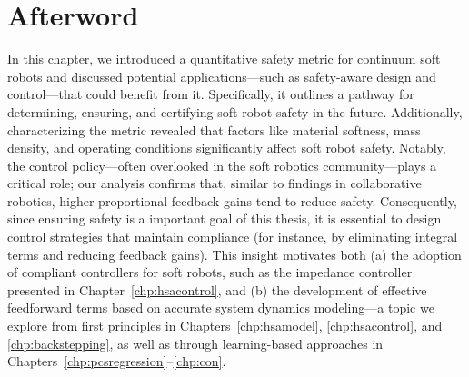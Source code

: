 \section*{Afterword}
In this chapter, we introduced a quantitative safety metric for continuum soft robots and discussed potential applications—such as safety-aware design and control—that could benefit from it. Specifically, it outlines a pathway for determining, ensuring, and certifying soft robot safety in the future. Additionally, characterizing the metric revealed that factors like material softness, mass density, and operating conditions significantly affect soft robot safety. Notably, the control policy—often overlooked in the soft robotics community—plays a critical role; our analysis confirms that, similar to findings in collaborative robotics, higher proportional feedback gains tend to reduce safety. Consequently, since ensuring safety is a important goal of this thesis, it is essential to design control strategies that maintain compliance (for instance, by eliminating integral terms and reducing feedback gains). This insight motivates both (a) the adoption of compliant controllers for soft robots, such as the impedance controller presented in Chapter~\ref{chp:hsacontrol}, and (b) the development of effective feedforward terms based on accurate system dynamics modeling—a topic we explore from first principles in Chapters~\ref{chp:hsamodel}, \ref{chp:hsacontrol}, and \ref{chp:backstepping}, as well as through learning-based approaches in Chapters~\ref{chp:pcsregression}–\ref{chp:con}.
